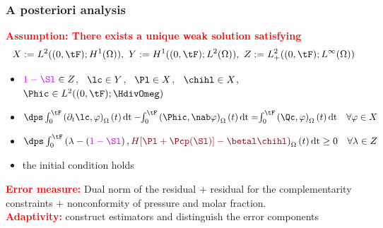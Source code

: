\begin{frame}
  \frametitle{A posteriori analysis}
  \textcolor{red}{\textbf{Assumption: There exists a unique weak solution satisfying}}
\begin{equation*}
X \egaldef L^2((0,\tF);H^1(\Omega)), \ Y  \egaldef H^1((0,\tF);L^2(\Omega)), 
 \  Z \egaldef L_{+}^2((0,\tF);L^{\infty}(\Omega)) 
\end{equation*}
\begin{itemize}
\item
$\textcolor{electricpurple}{1-\Sl} \in Z$, \ $\lc \in Y$, \ $\Pl \in X$, \ $\chihl \in X$, \ $\Phic \in L^2((0,\tF); \HdivOmeg)$
\item 
$\dps \int_{0}^{\tF} \left(\partial_t \lc, \varphi \right)_{\Omega}(t)\,\mathrm{dt}-\hspace{-0.1 cm}\int_{0}^{\tF} \left(\Phic, \nab \varphi \right)_{\Omega}(t)\,\mathrm{dt} = \hspace{-0.1 cm} \int_{0}^{\tF} \left(\Qc, \varphi \right)_{\Omega}(t)\,\mathrm{dt} \quad \forall \varphi \in X$
\item 
$\dps \int_{0}^{\tF} \left(\lambda - \left(\textcolor{electricpurple}{1 - \Sl}\right), \textcolor{carmine}{H[\Pl+\Pcp(\Sl)]-\betal \chihl}  \right)_{\Omega}(t)\,\mathrm{dt} \geq 0 \quad \forall \lambda \in Z$
\item
the initial condition holds
\end{itemize}
\textcolor{red}{\textbf{Error measure:}} Dual norm of the residual $+$ residual for the complementarity constraints $+$ nonconformity of pressure and molar fraction.
\\
\textcolor{red}{\textbf{Adaptivity:}} construct estimators and distinguish the error components

\end{frame}
% 
